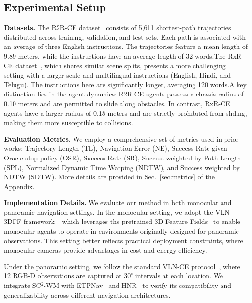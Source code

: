 \documentclass{article}
\theoremstyle{plain}
\theoremstyle{definition}
\theoremstyle{remark}
\begin{document}
\subsection{Experimental Setup}
\noindent\textbf{Datasets.} The R2R-CE dataset~\cite{krantz2020beyond,anderson2018vision} consists of 5,611 shortest-path trajectories distributed across training, validation, and test sets. Each path is associated with an average of three English instructions. The trajectories feature a mean length of 9.89 meters, while the instructions have an average length of 32 words.The RxR-CE dataset~\cite{krantz2020beyond, ku2020room}, which shares similar scene splits, presents a more challenging setting with a larger scale and multilingual instructions (English, Hindi, and Telugu). The instructions here are significantly longer, averaging 120 words.A key distinction lies in the agent dynamics: R2R-CE agents possess a chassis radius of 0.10 meters and are permitted to slide along obstacles. In contrast, RxR-CE agents have a larger radius of 0.18 meters and are strictly prohibited from sliding, making them more susceptible to collisions.

\noindent\textbf{Evaluation Metrics.} We employ a comprehensive set of metrics used in prior works\citep{anderson2018evaluation,anderson2018vision,ilharco2019general}: Trajectory Length (TL), Navigation Error (NE), Success Rate given Oracle stop policy (OSR), Success Rate (SR), Success weighted by Path Length (SPL), Normalized Dynamic Time Warping (NDTW), and Success weighted by NDTW (SDTW). More details are provided in Sec.~\ref{sec:metrics} of the Appendix.


\noindent\textbf{Implementation Details.}
We evaluate our method in both monocular and panoramic navigation settings. In the monocular setting, we adopt the VLN-3DFF framework~\citep{wang2024sim}, which leverages the pretrained 3D Feature Fields~\citep{wang2024lookahead} to enable monocular agents to operate in environments originally designed for panoramic observations. This setting better reflects practical deployment constraints, where monocular cameras provide advantages in cost and energy efficiency.

Under the panoramic setting, we follow the standard VLN-CE protocol~\cite{krantz2020beyond,krantz2021waypoint}, where 12 RGB-D observations are captured at $30^\circ$ intervals at each location. We integrate SC$^{2}$-WM with ETPNav~\cite{an2024etpnav} and HNR~\cite{wang2024lookahead} to verify its compatibility and generalizability across different navigation architectures.
\end{document}
